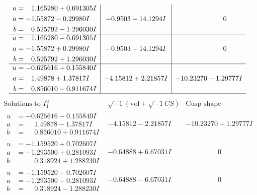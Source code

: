 \documentclass[1p]{elsarticle_modified}
\theoremstyle{definition}
\newcommand{\I}{\sqrt{-1}}
\begin{document}
$$\begin{array}{c|c|c}
\begin{aligned}
u &= \phantom{-}1.165280 + 0.691305 I \\
a &= -1.55872 - 0.29980 I \\
b &= \phantom{-}0.525792 - 1.296030 I\end{aligned}
 & -0.9503 - 14.1294 I & \phantom{-0.000000 } 0 \\ \hline\begin{aligned}
u &= \phantom{-}1.165280 - 0.691305 I \\
a &= -1.55872 + 0.29980 I \\
b &= \phantom{-}0.525792 + 1.296030 I\end{aligned}
 & -0.9503 + 14.1294 I & \phantom{-0.000000 } 0 \\ \hline\begin{aligned}
u &= -0.625616 + 0.155840 I \\
a &= \phantom{-}1.49878 + 1.37817 I \\
b &= \phantom{-}0.856010 - 0.911674 I\end{aligned}
 & -4.15812 + 2.21857 I & -10.23270 - 1.29777 I\\
 \hline 
 \end{array}$$\newpage$$\begin{array}{c|c|c}  
\text{Solutions to }I^u_{1}& \I (\text{vol} + \sqrt{-1}CS) & \text{Cusp shape}\\
 \hline 
\begin{aligned}
u &= -0.625616 - 0.155840 I \\
a &= \phantom{-}1.49878 - 1.37817 I \\
b &= \phantom{-}0.856010 + 0.911674 I\end{aligned}
 & -4.15812 - 2.21857 I & -10.23270 + 1.29777 I \\ \hline\begin{aligned}
u &= -1.159520 + 0.702607 I \\
a &= -1.293500 + 0.281093 I \\
b &= \phantom{-}0.318924 + 1.288230 I\end{aligned}
 & -0.64888 + 6.67031 I & \phantom{-0.000000 } 0 \\ \hline\begin{aligned}
u &= -1.159520 - 0.702607 I \\
a &= -1.293500 - 0.281093 I \\
b &= \phantom{-}0.318924 - 1.288230 I\end{aligned}
 & -0.64888 - 6.67031 I & \phantom{-0.000000 } 0 \\ \hline\begin{aligned}

\end{aligned}
\end{array}$$
\end{document}
